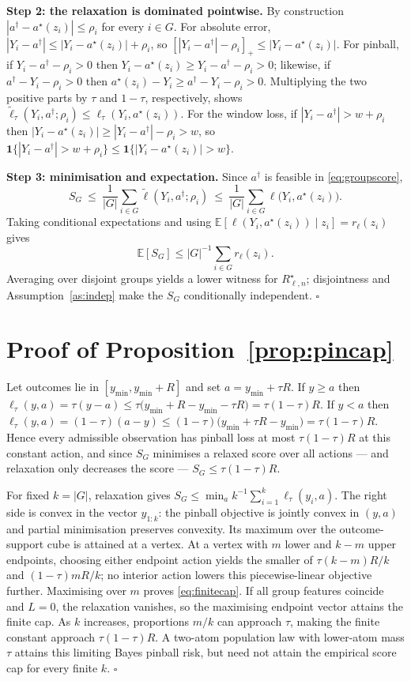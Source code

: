 \documentclass[11pt]{article}
\theoremstyle{definition}
\newcommand{\risk}{R^{\star}}
\newcommand{\E}{\mathbb{E}}
\newcommand{\ind}{\mathbf{1}}
\newcommand{\clip}[1]{\left[#1\right]_+}
\begin{document}
\textbf{Step 2: the relaxation is dominated pointwise.} By construction $|a^\dagger-a^\star(z_i)|\le\rho_i$ for every $i\in G$. For absolute error,
$|Y_i-a^\dagger|\le|Y_i-a^\star(z_i)|+\rho_i$, so
$\clip{|Y_i-a^\dagger|-\rho_i}\le|Y_i-a^\star(z_i)|$.
For pinball, if $Y_i-a^\dagger-\rho_i>0$ then $Y_i-a^\star(z_i)\ge Y_i-a^\dagger-\rho_i>0$; likewise, if $a^\dagger-Y_i-\rho_i>0$ then $a^\star(z_i)-Y_i\ge a^\dagger-Y_i-\rho_i>0$. Multiplying the two positive parts by $\tau$ and $1-\tau$, respectively, shows $\tilde\ell_\tau(Y_i,a^\dagger;\rho_i)\le\ell_\tau(Y_i,a^\star(z_i))$. For the window loss, if $|Y_i-a^\dagger|>w+\rho_i$ then $|Y_i-a^\star(z_i)|\ge|Y_i-a^\dagger|-\rho_i>w$, so
$\ind\{|Y_i-a^\dagger|>w+\rho_i\}\le\ind\{|Y_i-a^\star(z_i)|>w\}$.

\textbf{Step 3: minimisation and expectation.} Since $a^\dagger$ is feasible in \eqref{eq:groupscore},
\[
S_G\ \le\ \frac1{|G|}\sum_{i\in G}\tilde\ell(Y_i,a^\dagger;\rho_i)\ \le\ \frac1{|G|}\sum_{i\in G}\ell\big(Y_i,a^\star(z_i)\big).
\]
Taking conditional expectations and using $\E[\ell(Y_i,a^\star(z_i))\mid z_i]=r_\ell(z_i)$ gives
\[
\E[S_G]\le |G|^{-1}\sum_{i\in G}r_\ell(z_i).
\]
Averaging over disjoint groups yields a lower witness for $\risk_{\ell,n}$; disjointness and Assumption~\ref{as:indep} make the $S_G$ conditionally independent. \hfill$\square$

\section{Proof of Proposition~\ref{prop:pincap}}\label{app:pincap}

Let outcomes lie in $[y_{\min},y_{\min}+R]$ and set $a=y_{\min}+\tau R$. If $y\ge a$ then
$\ell_\tau(y,a)=\tau(y-a)\le\tau\big(y_{\min}+R-y_{\min}-\tau R\big)=\tau(1-\tau)R$.
If $y<a$ then
$\ell_\tau(y,a)=(1-\tau)(a-y)\le(1-\tau)\big(y_{\min}+\tau R-y_{\min}\big)=\tau(1-\tau)R$.
Hence every admissible observation has pinball loss at most $\tau(1-\tau)R$ at this constant action, and since $S_G$ minimises a relaxed score over all actions --- and relaxation only decreases the score --- $S_G\le\tau(1-\tau)R$.

For fixed $k=|G|$, relaxation gives $S_G\le\min_a k^{-1}\sum_{i=1}^k\ell_\tau(y_i,a)$. The right side is convex in the vector $y_{1:k}$: the pinball objective is jointly convex in $(y,a)$ and partial minimisation preserves convexity. Its maximum over the outcome-support cube is attained at a vertex. At a vertex with $m$ lower and $k-m$ upper endpoints, choosing either endpoint action yields the smaller of $\tau(k-m)R/k$ and $(1-\tau)mR/k$; no interior action lowers this piecewise-linear objective further. Maximising over $m$ proves \eqref{eq:finitecap}. If all group features coincide and $L=0$, the relaxation vanishes, so the maximising endpoint vector attains the finite cap. As $k$ increases, proportions $m/k$ can approach $\tau$, making the finite constant approach $\tau(1-\tau)R$. A two-atom population law with lower-atom mass $\tau$ attains this limiting Bayes pinball risk, but need not attain the empirical score cap for every finite $k$. \hfill$\square$
\end{document}
